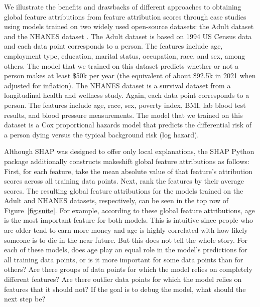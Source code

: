 \documentclass[11pt,dvipdfmx]{article}
\begin{document}
We illustrate the benefits and drawbacks of different approaches to
obtaining global feature attributions from feature attribution scores through
case studies using models trained on two widely used open-source
datasets: the Adult dataset \citep{Adult} and the NHANES dataset
\citep{NHANES}. The Adult dataset is based on 1994 US Census data and
each data point corresponds to a person. The features include age,
employment type, education, marital status, occupation, race, and sex,
among others. The model that we trained on this dataset predicts
whether or not a person makes at least \$50k per year (the equivalent
of about \$92.5k in 2021 when adjusted for inflation). The NHANES
dataset is a survival dataset from a longitudinal health and wellness
study. Again, each data point corresponds to a person. The features
include age, race, sex, poverty index, BMI, lab blood test results,
and blood pressure measurements. The model that we trained on this
dataset is a Cox proportional hazards model that predicts the
differential risk of a person dying versus the typical background risk
(log hazard).

Although SHAP was designed to offer only local explanations, the SHAP
Python package additionally constructs makeshift global feature attributions as
follows: First, for each feature, take the mean absolute value of that
feature's attribution scores across all training data points. Next,
rank the features by their average scores. The resulting global
feature attributions for the models trained on the Adult and NHANES
datasets, respectively, can be seen in the top row of
Figure~\ref{fig:suite}.  For example, according to these global
feature attributions, age is the most important feature for both
models.  This is intuitive since people who are older tend to earn
more money and age is highly correlated with how likely someone is to
die in the near future. But this does not tell the whole story.  For
each of these models, does age play an equal role in the model's
predictions for all training data points, or is it more important for
some data points than for others?  Are there groups of data points for
which the model relies on completely different features?  Are there
outlier data points for which the model relies on features that it
should not?  If the goal is to debug the model, what should the next
step be?
\end{document}
